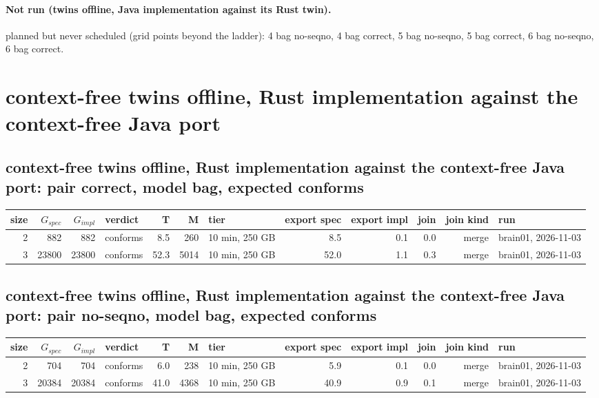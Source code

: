 \documentclass[10pt]{article}
\begin{document}
\paragraph{Not run (twins offline, Java implementation against its Rust twin).}
planned but never scheduled (grid points beyond the ladder): 4 bag no-seqno, 4 bag correct, 5 bag no-seqno, 5 bag correct, 6 bag no-seqno, 6 bag correct.\par
\section*{context-free twins offline, Rust implementation against the context-free Java port}
\subsection*{context-free twins offline, Rust implementation against the context-free Java port: pair \textsf{correct}, model bag, expected conforms}
\begin{longtable}{@{}rrrlrrlrrrrl@{}}
\toprule
size & $G_{\mathit{spec}}$ & $G_{\mathit{impl}}$ & verdict & T & M & tier & export spec & export impl & join & join kind & run \\
\midrule
\endhead
\color{blue} 2 & 882 & 882 & conforms & 8.5 & 260 & 10 min, 250 GB & 8.5 & 0.1 & 0.0 & merge & brain01, 2026-11-03 \\
\color{blue} 3 & 23800 & 23800 & conforms & 52.3 & 5014 & 10 min, 250 GB & 52.0 & 1.1 & 0.3 & merge & brain01, 2026-11-03 \\
\bottomrule
\end{longtable}
\subsection*{context-free twins offline, Rust implementation against the context-free Java port: pair \textsf{no-seqno}, model bag, expected conforms}
\begin{longtable}{@{}rrrlrrlrrrrl@{}}
\toprule
size & $G_{\mathit{spec}}$ & $G_{\mathit{impl}}$ & verdict & T & M & tier & export spec & export impl & join & join kind & run \\
\midrule
\endhead
\color{blue} 2 & 704 & 704 & conforms & 6.0 & 238 & 10 min, 250 GB & 5.9 & 0.1 & 0.0 & merge & brain01, 2026-11-03 \\
\color{blue} 3 & 20384 & 20384 & conforms & 41.0 & 4368 & 10 min, 250 GB & 40.9 & 0.9 & 0.1 & merge & brain01, 2026-11-03 \\
\bottomrule
\end{longtable}
\end{document}
